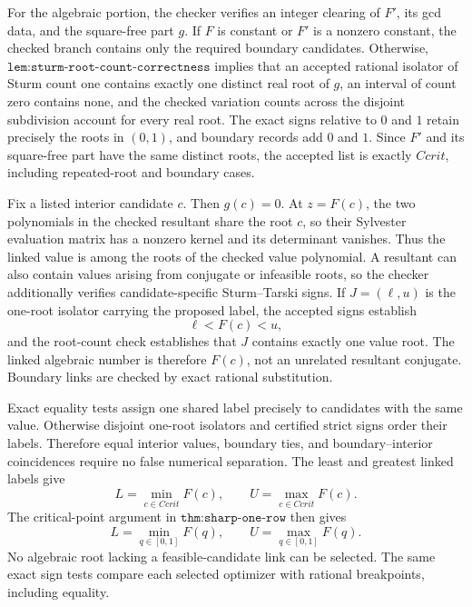 For the algebraic portion, the checker verifies an integer clearing of \(F'\), its gcd data, and the square-free part \(g\).  If \(F\) is constant or \(F'\) is a nonzero constant, the checked branch contains only the required boundary candidates.  Otherwise, \(\texttt{lem:sturm-root-count-correctness}\) implies that an accepted rational isolator of Sturm count one contains exactly one distinct real root of \(g\), an interval of count zero contains none, and the checked variation counts across the disjoint subdivision account for every real root.  The exact signs relative to \(0\) and \(1\) retain precisely the roots in \((0,1)\), and boundary records add \(0\) and \(1\).  Since \(F'\) and its square-free part have the same distinct roots, the accepted list is exactly \(Ccrit\), including repeated-root and boundary cases.

Fix a listed interior candidate \(c\).  Then \(g(c)=0\).  At \(z=F(c)\), the two polynomials in the checked resultant share the root \(c\), so their Sylvester evaluation matrix has a nonzero kernel and its determinant vanishes.  Thus the linked value is among the roots of the checked value polynomial.  A resultant can also contain values arising from conjugate or infeasible roots, so the checker additionally verifies candidate-specific Sturm--Tarski signs.  If \(J=(\ell,u)\) is the one-root isolator carrying the proposed label, the accepted signs establish
\[
 \ell<F(c)<u,
\]
and the root-count check establishes that \(J\) contains exactly one value root.  The linked algebraic number is therefore \(F(c)\), not an unrelated resultant conjugate.  Boundary links are checked by exact rational substitution.

Exact equality tests assign one shared label precisely to candidates with the same value.  Otherwise disjoint one-root isolators and certified strict signs order their labels.  Therefore equal interior values, boundary ties, and boundary--interior coincidences require no false numerical separation.  The least and greatest linked labels give
\[
 L=\min_{c\in Ccrit}F(c),
 \qquad
 U=\max_{c\in Ccrit}F(c).
\]
The critical-point argument in \(\texttt{thm:sharp-one-row}\) then gives
\[
 L=\min_{q\in[0,1]}F(q),
 \qquad
 U=\max_{q\in[0,1]}F(q).
\]
No algebraic root lacking a feasible-candidate link can be selected.  The same exact sign tests compare each selected optimizer with rational breakpoints, including equality.

